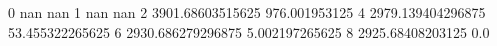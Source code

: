 0 nan nan
1 nan nan
2 3901.68603515625 976.001953125
4 2979.139404296875 53.455322265625
6 2930.686279296875 5.002197265625
8 2925.68408203125 0.0
